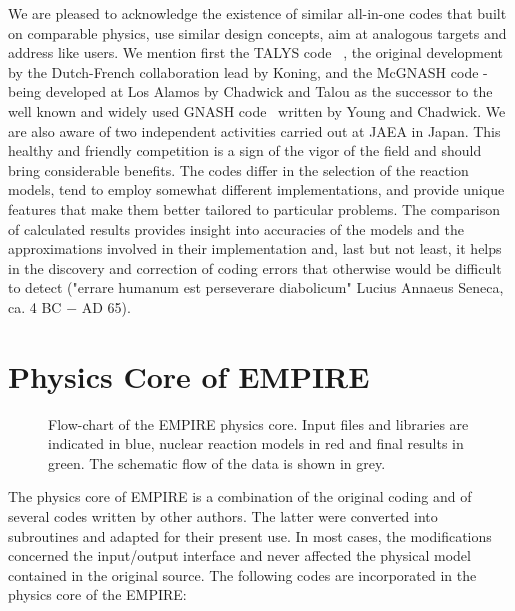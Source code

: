 We are pleased to acknowledge the existence of similar all-in-one codes that
built on comparable physics, use similar design concepts, aim at analogous
targets and address like users. We mention first the TALYS code~%
\cite{TALYS}, the original development by the Dutch-French collaboration
lead by Koning, and the McGNASH code - being developed at Los Alamos by
Chadwick and Talou as the successor to the well known and widely used GNASH
code~\cite{Young:77, Young:92, Young:98} written by Young and Chadwick. We
are also aware of two independent activities carried out at JAEA in
Japan. This healthy and friendly competition is a sign of the vigor of
the field and should bring considerable benefits. The codes differ in the
selection of the reaction models, tend to employ somewhat different
implementations, and provide unique features that make them better tailored
to particular problems. The comparison of calculated results provides
insight into accuracies of the models and the approximations involved in their
implementation and, last but not least, it helps in the discovery and correction
of coding errors that otherwise would be difficult to detect ("errare humanum
est perseverare diabolicum" Lucius Annaeus Seneca, ca. 4 BC $-$ AD 65).

\section{Physics Core of EMPIRE}

\begin{figure*}[htbp]
\caption{Flow-chart of the EMPIRE physics core. Input files and libraries
are indicated in blue, nuclear reaction models in red and
final results in green. The schematic flow of the data is shown in grey.}
\label{fig:physics-core}
\end{figure*}

The physics core of EMPIRE is a combination of the original coding and of
several codes written by other authors. The latter were converted into
subroutines and adapted for their present use. In most cases, the
modifications concerned the input/output interface and never affected the
physical model contained in the original source. The following codes are
incorporated in the physics core of the EMPIRE:

